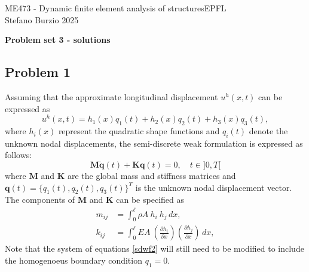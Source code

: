 \documentclass[12pt]{article}
\begin{document}
\noindent ME473 - Dynamic finite element analysis of structures\hfill EPFL\\
Stefano Burzio \hfill 2025\\
\vspace{0.3cm}

\hspace*{\fill}\textbf{\Large Problem set 3 - solutions}\hspace*{\fill}

\hrulefill

\subsection*{Problem 1}
Assuming that the approximate longitudinal displacement \( u^h(x,t) \) can be expressed as
\[
    u^h(x,t) = h_1(x)q_1(t) + h_2(x)q_2(t) + h_3(x)q_3(t),
\]
where \( h_i(x) \) represent the quadratic shape functions and \( q_i(t) \) denote the unknown nodal displacements, the semi-discrete weak formulation is expressed as follows:
\begin{equation}\label{sdwf2}
    \mathbf{M} \ddot{\mathbf{q}}(t) + \mathbf{K} \mathbf{q}(t) = 0, \quad t \in]0,T[
\end{equation}
where $\mathbf{M}$ and $\mathbf{K}$ are the global mass and stiffness matrices and $\mathbf{q}(t)=\{q_1(t),q_2(t),q_3(t)\}^T$ is the unknown nodal displacement vector. The components of $\mathbf{M}$ and $\mathbf{K}$ can be specified as
\begin{align*}
    m_{ij} & = \int_{0}^{\ell} \rho A \ h_i \ h_j \, dx,                                                                                 \\
    k_{ij} & = \int_{0}^{\ell} EA \ \left( \frac{\partial h_i}{\partial x} \right) \left( \frac{\partial h_j}{\partial x} \right) \, dx,
\end{align*}
Note that the system of equations \eqref{sdwf2} will still need to be modified to include the homogenoeus boundary condition $q_1 = 0$.
\end{document}
